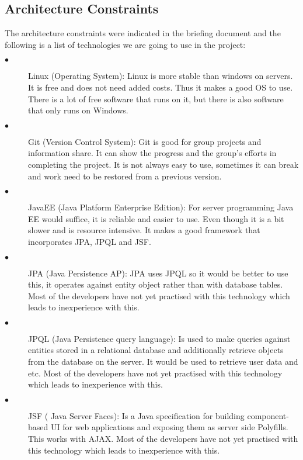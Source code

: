 \documentclass[hidelinks, 12pt]{article}
\begin{document}
\subsection{Architecture Constraints}

The architecture constraints were indicated in the briefing document and the following is a list of technologies we are going to use in the project:

\begin{description}
  \item[$\bullet$] Linux (Operating System):
  Linux is more stable than windows on servers. It is free and does not need added costs. Thus it makes a good OS to use. There is a lot of free software that runs on it, but there is also software that only runs on Windows. 
  
  \item[$\bullet$] Git (Version Control System):
  Git is good for group projects and information share. It can show the progress and the group’s efforts in completing the project. It is not always easy to use, sometimes it can break and work need to be restored from a previous version.
  
  \item[$\bullet$] JavaEE (Java Platform Enterprise Edition):
  For server programming Java EE would suffice, it is reliable and easier to use. Even though it is a bit slower and is resource intensive. It makes a good framework that incorporates JPA,  JPQL and JSF.
  
  \item[$\bullet$]JPA (Java Persistence AP):
  JPA uses JPQL so it would be better to use this, it operates against entity object rather than with database tables. Most of the developers have not yet practised with this technology which leads to inexperience with this. 
  
  \item[$\bullet$] JPQL (Java Persistence query language):
  Is used to make queries against entities stored in a relational database and additionally retrieve objects from the database on the server. It would be used to retrieve user data and etc. Most of the developers have not yet practised with this technology which leads to inexperience with this. 
  
  \item[$\bullet$] JSF ( Java Server Faces):
  Is a Java specification for building component-based UI for web applications and exposing them as server side Polyfills. This works with AJAX. Most of the developers have not yet practised with this technology which leads to inexperience with this. 
  

\end{description}
\end{document}
